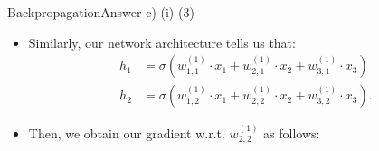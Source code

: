 \documentclass[t]{beamer}
\begin{document}
\begin{frame}{Backpropagation}{Answer c) (i) (3)}
    \begin{itemize}
        \item Similarly, our network architecture tells us that:
              \begin{align*}
                  h_1 & = \sigma(w^{(1)}_{1,1}\cdot x_1 + w^{(1)}_{2,1}\cdot x_2 + w^{(1)}_{3,1}\cdot x_3)  \\
                  h_2 & = \sigma(w^{(1)}_{1,2}\cdot x_1 + w^{(1)}_{2,2}\cdot x_2 + w^{(1)}_{3,2}\cdot x_3).
              \end{align*}
        \item Then, we obtain our gradient w.r.t. $w_{2,2}^{(1)}$ as follows:
    \end{itemize}
\end{frame}
\end{document}
